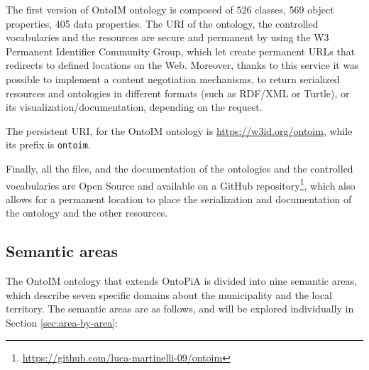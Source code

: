 The first version of \ac{OntoIM} ontology is composed of 526 classes, 569 object properties, 405 data properties. The \ac{URI} of the ontology, the controlled vocabularies and the resources are secure and permanent by using the  W3 Permanent Identifier Community Group, which let create permanent \acp{URL} that redirects to defined locations on the Web. Moreover, thanks to this service it was possible to implement a content negotiation mechanisms, to return serialized resources and ontologies in different formats (such as \ac{RDF}/\ac{XML} or Turtle), or its visualization/documentation, depending on the request.

The persistent \ac{URI}, for the \ac{OntoIM} ontology is \url{https://w3id.org/ontoim}, while its prefix is \verb#ontoim#.

Finally, all the files, and the documentation of the ontologies and the controlled vocabularies are Open Source and available on a GitHub repository\footnote{\url{https://github.com/luca-martinelli-09/ontoim}}, which also allows for a permanent location to place the serialization and documentation of the ontology and the other resources.

\subsection{Semantic areas}
\label{subsec:semantic-areas}

The \ac{OntoIM} ontology that extends OntoPiA is divided into nine semantic areas, which describe seven specific domains about the municipality and the local territory. The semantic areas are as follows, and will be explored individually in Section \ref{sec:area-by-area}:

